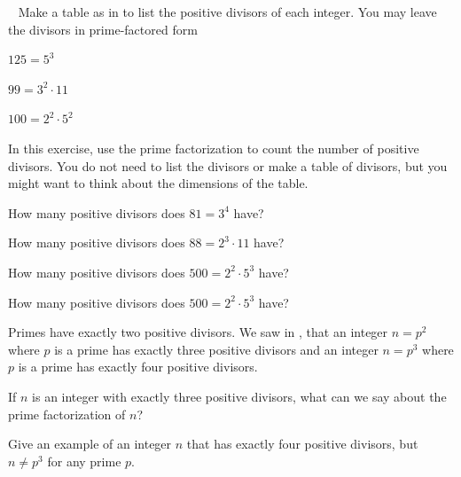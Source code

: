 \begin{exer}[\exerP] %
\label{exer_list_divisors_1or2_primes}
~
    Make a table as in  to list the positive divisors of each integer. You may leave the divisors in prime-factored form
        \begin{apart}
            \item $125=5^3$
            \item $99 = 3^2 \cdot 11$
            \item $100 = 2^2 \cdot 5^2$
        \end{apart}
\end{exer}

\begin{exer}[\exerP] %
\label{exer_countdiv_no_list}
    In this exercise, use the prime factorization to count the number of positive divisors.  You do not need to list the divisors or make a table of divisors, but you might want to think about the dimensions of the table.   
        \begin{exerpart}
            \item How many positive divisors does $81 = 3^4$ have?  
            \item How many positive divisors does $88 = 2^3 \cdot 11$ have? 
            \item How many positive divisors does $500 = 2^2 \cdot 5^3$ have? 
            \item How many positive divisors does $500 = 2^2 \cdot 5^3$ have?    
        \end{exerpart}
\end{exer}

\begin{exer}[\exerU] %
\label{exer_int_3or4_div}
    Primes have exactly two positive divisors.  We saw in , that an integer $n=p^2$ where $p$ is a prime has exactly three positive divisors and an integer $n=p^3$ where $p$ is a prime has exactly four positive divisors.
        \begin{apart}
             \item If $n$ is an integer with exactly three positive divisors, what can we say about the prime factorization of $n$?
            \item Give an example of an integer $n$ that has exactly four positive divisors, but $n \neq p^3$ for any prime $p$.
        \end{apart}
\end{exer}


